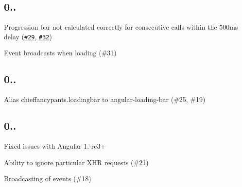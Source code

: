\subsection*{0..}


\begin{DoxyItemize}
\item Progression bar not calculated correctly for consecutive calls within the 500ms delay (\href{https://github.com/chieffancypants/angular-loading-bar/issues/29}{\tt \#29}, \href{https://github.com/chieffancypants/angular-loading-bar/issues/32}{\tt \#32})
\item Event broadcasts when loading (\#31)
\end{DoxyItemize}

\subsection*{0..}


\begin{DoxyItemize}
\item Alias chieffancypants.\+loadingbar to angular-\/loading-\/bar (\#25, \#19)
\end{DoxyItemize}

\subsection*{0..}


\begin{DoxyItemize}
\item Fixed issues with Angular 1.-\/rc3+
\item Ability to ignore particular X\+HR requests (\#21)
\item Broadcasting of events (\#18) 
\end{DoxyItemize}